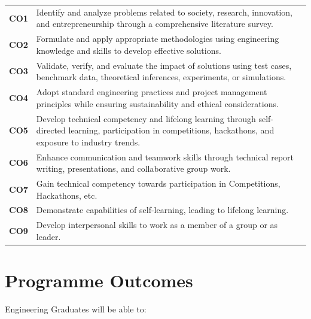 \documentclass[12pt,a4paper]{article}
\begin{document}
\begin{tabular}{p{0.5cm} p{14cm}}
\textbf{CO1} & Identify and analyze problems related to society, research, innovation, and entrepreneurship through a comprehensive literature survey. \\
\textbf{CO2} & Formulate and apply appropriate methodologies using engineering knowledge and skills to develop effective solutions. \\
\textbf{CO3} & Validate, verify, and evaluate the impact of solutions using test cases, benchmark data, theoretical inferences, experiments, or simulations. \\
\textbf{CO4} & Adopt standard engineering practices and project management principles while ensuring sustainability and ethical considerations. \\
\textbf{CO5} & Develop technical competency and lifelong learning through self-directed learning, participation in competitions, hackathons, and exposure to industry trends. \\
\textbf{CO6} & Enhance communication and teamwork skills through technical report writing, presentations, and collaborative group work. \\
\textbf{CO7} & Gain technical competency towards participation in Competitions, Hackathons, etc. \\
\textbf{CO8} & Demonstrate capabilities of self-learning, leading to lifelong learning. \\
\textbf{CO9} & Develop interpersonal skills to work as a member of a group or as leader. \\
\end{tabular}

\newpage

\section*{Programme Outcomes}
\vspace{0.5cm}

Engineering Graduates will be able to:

\medskip
\end{document}
